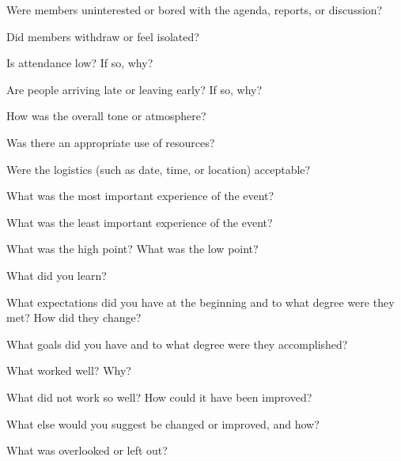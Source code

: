 \squishitemize%
\item Were members uninterested or bored with the agenda, reports,
  or discussion?
\item Did members withdraw or feel isolated?
\item Is attendance low? If so, why?
\item Are people arriving late or leaving early? If so, why?
\item How was the overall tone or atmosphere?
\item Was there an appropriate use of resources?
\item Were the logistics (such as date, time, or location)
  acceptable?
\item What was the most important experience of the event?
\item What was the least important experience of the event?
\item What was the high point? What was the low point?
\item What did you learn?
\item What expectations did you have at the beginning and to what
  degree were they met? How did they change?
\item What goals did you have and to what degree were they
  accomplished?
\item What worked well? Why?
\item What did not work so well? How could it have been improved?
\item What else would you suggest be changed or improved, and how?
\item What was overlooked or left out?
\squishend%

